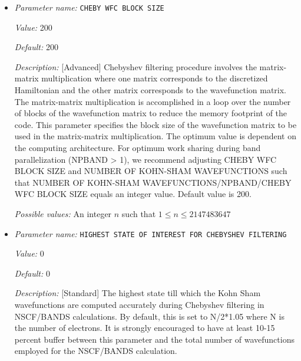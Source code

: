 \begin{itemize}
{\it Possible values:} A floating point number $v$ such that $0 \leq v \leq 2000$
\item {\it Parameter name:} {\tt CHEBY WFC BLOCK SIZE}
\label{parameters:SCF parameters/Eigen_2dsolver parameters/CHEBY WFC BLOCK SIZE}
\label{parameters:SCF_20parameters/Eigen_2dsolver_20parameters/CHEBY_20WFC_20BLOCK_20SIZE}


{\it Value:} 200


{\it Default:} 200


{\it Description:} [Advanced] Chebyshev filtering procedure involves the matrix-matrix multiplication where one matrix corresponds to the discretized Hamiltonian and the other matrix corresponds to the wavefunction matrix. The matrix-matrix multiplication is accomplished in a loop over the number of blocks of the wavefunction matrix to reduce the memory footprint of the code. This parameter specifies the block size of the wavefunction matrix to be used in the matrix-matrix multiplication. The optimum value is dependent on the computing architecture. For optimum work sharing during band parallelization (NPBAND > 1), we recommend adjusting CHEBY WFC BLOCK SIZE and NUMBER OF KOHN-SHAM WAVEFUNCTIONS such that NUMBER OF KOHN-SHAM WAVEFUNCTIONS/NPBAND/CHEBY WFC BLOCK SIZE equals an integer value. Default value is 200.


{\it Possible values:} An integer $n$ such that $1\leq n \leq 2147483647$
\item {\it Parameter name:} {\tt HIGHEST STATE OF INTEREST FOR CHEBYSHEV FILTERING}
\label{parameters:SCF parameters/Eigen_2dsolver parameters/HIGHEST STATE OF INTEREST FOR CHEBYSHEV FILTERING}
\label{parameters:SCF_20parameters/Eigen_2dsolver_20parameters/HIGHEST_20STATE_20OF_20INTEREST_20FOR_20CHEBYSHEV_20FILTERING}


{\it Value:} 0


{\it Default:} 0


{\it Description:} [Standard] The highest state till which the Kohn Sham wavefunctions are computed accurately during Chebyshev filtering in NSCF/BANDS calculations. By default, this is set to N/2*1.05 where N is the number of electrons. It is strongly encouraged to have at least 10-15 percent buffer between this parameter and the total number of wavefunctions employed for the NSCF/BANDS calculation.



\end{itemize}
